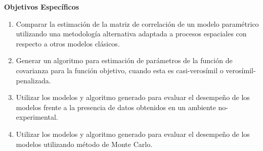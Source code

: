 \noindent\textbf{Objetivos Espec\'ificos}
\begin{enumerate}
    \item Comparar la estimaci\'on de la matriz de correlaci\'on de un modelo param\'etrico utilizando una metodolog\'ia alternativa adaptada a procesos espaciales con respecto a otros modelos cl\'asicos.
    \item Generar un algoritmo para estimaci\'on de par\'ametros de la funci\'on de covarianza para la funci\'on objetivo, cuando esta es casi-veros\'imil o veros\'imil-penalizada.
    \item Utilizar los modelos y algoritmo generado para evaluar el desempeño de los modelos frente a la presencia de datos obtenidos en un ambiente no-experimental.
    \item Utilizar los modelos y algoritmo generado para evaluar el desempeño de los modelos utilizando m\'etodo de Monte Carlo.
\end{enumerate}